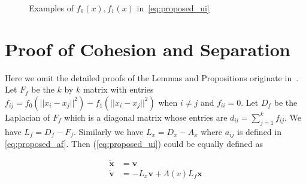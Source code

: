 \begin{figure}[htb]
  \centering
  \caption{Examples of $f_0(x), f_1(x)$ in~\ref{eq:proposed_ui}}\label{fig:f0f1}
\end{figure}

\section{Proof of Cohesion and Separation}

Here we omit the detailed proofs of the Lemmas and Propositions originate in~\cite{CuckerDong2010}. Let $F_f$ be the $k$ by $k$ matrix with entries $f_{ij}=f_0(||x_i-x_j||^2)-f_1(||x_i-x_j||^2)$ when $i\neq j$ and $f_{ii}=0$. Let $D_f$ be the Laplacian of $F_f$ which is a diagonal matrix whose entries are $d_{ii}=\sum_{j=1}^k f_{ij}$. We have $L_f=D_f-F_f$. Similarly we have $L_x=D_x-A_x$ where $a_{ij}$ is defined in \ref{eq:proposed_af}. Then (\ref{eq:proposed_ui}) could be equally defined as

\begin{equation}\label{eq:continuous}
\begin{aligned}
\mathbf{\dot{x}}&=\mathbf{v}\\
\mathbf{\dot{v}}&=-L_x\mathbf{v}+\Lambda(v)L_f\mathbf{x}\\
\end{aligned}
\end{equation}

